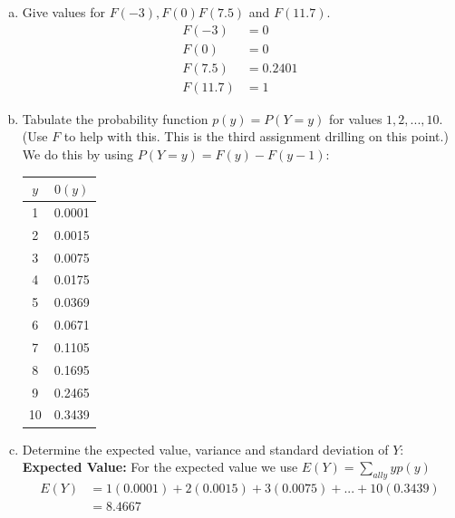 \documentclass{scrartcl}
\begin{document}
\begin{enumerate}
\begin{enumerate}[a)]
    \item Give values for $F(-3), F(0) F(7.5)$ and $F(11.7)$.\\
      \begin{align*}
        F(-3)   &= 0\\
        F(0)    &= 0\\
        F(7.5)  &= 0.2401\\
        F(11.7) &= 1
      \end{align*}

    \item Tabulate the probability function $p(y) = P(Y = y)$ for values $1, 2, ..., 10$. (Use $F$ to help with this. This is the third assignment drilling on this point.)\\
      
      We do this by using $P(Y = y) = F(y) - F(y-1)$:

      \begin{center}
        \begin{tabular} { |c|c| }
          \hline
          $y$&$0(y)$\\
          \hline
          1  & 0.0001\\
          \hline
          2  & 0.0015\\
          \hline
          3  & 0.0075\\
          \hline
          4  & 0.0175\\
          \hline
          5  & 0.0369\\
          \hline
          6  & 0.0671\\
          \hline
          7  & 0.1105\\
          \hline
          8  & 0.1695\\
          \hline
          9  & 0.2465\\
          \hline
          10 & 0.3439\\
          \hline
        \end{tabular}
      \end{center}
\pagebreak
    \item Determine the expected value, variance and standard deviation of $Y$:\\

      \textbf{Expected Value:} For the expected value we use $E(Y) = \sum_{all y}yp(y)$\\
      \begin{align*}
        E(Y) &= 1(0.0001) + 2(0.0015) + 3(0.0075) + ... + 10(0.3439)\\
             &= 8.4667
      \end{align*}\\


\end{enumerate}
\end{enumerate}
\end{document}
